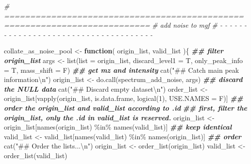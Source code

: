 \documentclass[
]{article}
\newenvironment{Shaded}{\begin{snugshade}}{\end{snugshade}}
\newcommand{\AttributeTok}[1]{\textcolor[rgb]{0.77,0.63,0.00}{#1}}
\newcommand{\CommentTok}[1]{\textcolor[rgb]{0.56,0.35,0.01}{\textit{#1}}}
\newcommand{\ControlFlowTok}[1]{\textcolor[rgb]{0.13,0.29,0.53}{\textbf{#1}}}
\newcommand{\DecValTok}[1]{\textcolor[rgb]{0.00,0.00,0.81}{#1}}
\newcommand{\DocumentationTok}[1]{\textcolor[rgb]{0.56,0.35,0.01}{\textbf{\textit{#1}}}}
\newcommand{\FunctionTok}[1]{\textcolor[rgb]{0.00,0.00,0.00}{#1}}
\newcommand{\NormalTok}[1]{#1}
\newcommand{\OtherTok}[1]{\textcolor[rgb]{0.56,0.35,0.01}{#1}}
\newcommand{\SpecialCharTok}[1]{\textcolor[rgb]{0.00,0.00,0.00}{#1}}
\newcommand{\StringTok}[1]{\textcolor[rgb]{0.31,0.60,0.02}{#1}}
\begin{document}
\begin{Shaded}
\begin{Highlighting}[]
\CommentTok{\# ==========================================================================}
\CommentTok{\# add noise to mgf}
\CommentTok{\# {-} {-} {-} {-} {-} {-} {-} {-} {-} {-} {-} {-} {-} {-} {-} {-} {-} {-} {-} {-} {-} {-} {-} {-} {-} {-} {-} {-} {-} {-} {-} {-} {-} {-} {-} {-} {-}}

\NormalTok{collate\_as\_noise\_pool }\OtherTok{\textless{}{-}} 
  \ControlFlowTok{function}\NormalTok{(}
\NormalTok{    origin\_list,}
\NormalTok{    valid\_list}
\NormalTok{    )\{}
    \DocumentationTok{\#\# filter origin\_list}
\NormalTok{    args }\OtherTok{\textless{}{-}} \FunctionTok{list}\NormalTok{(}\AttributeTok{list =}\NormalTok{ origin\_list, }\AttributeTok{discard\_level1 =}\NormalTok{ T, }\AttributeTok{only\_peak\_info =}\NormalTok{ T, }\AttributeTok{mass\_shift =}\NormalTok{ F)}
    \DocumentationTok{\#\# get mz and intensity}
    \FunctionTok{cat}\NormalTok{(}\StringTok{"\#\# Catch main peak information}\SpecialCharTok{\textbackslash{}n}\StringTok{"}\NormalTok{)}
\NormalTok{    origin\_list }\OtherTok{\textless{}{-}} \FunctionTok{do.call}\NormalTok{(spectrum\_add\_noise, args)}
    \DocumentationTok{\#\# discard the NULL data}
    \FunctionTok{cat}\NormalTok{(}\StringTok{"\#\# Discard empty dataset}\SpecialCharTok{\textbackslash{}n}\StringTok{"}\NormalTok{)}
\NormalTok{    order\_list }\OtherTok{\textless{}{-}}\NormalTok{ origin\_list[}\FunctionTok{vapply}\NormalTok{(origin\_list, is.data.frame, }\FunctionTok{logical}\NormalTok{(}\DecValTok{1}\NormalTok{), }\AttributeTok{USE.NAMES =}\NormalTok{ F)]}
    \DocumentationTok{\#\# order the origin\_list and valid\_list according to .id}
    \DocumentationTok{\#\# first, filter the origin\_list, only the .id in valid\_list is reserved.}
\NormalTok{    origin\_list }\OtherTok{\textless{}{-}}\NormalTok{ origin\_list[}\FunctionTok{names}\NormalTok{(origin\_list) }\SpecialCharTok{\%in\%} \FunctionTok{names}\NormalTok{(valid\_list)]}
    \DocumentationTok{\#\# keep identical}
\NormalTok{    valid\_list }\OtherTok{\textless{}{-}}\NormalTok{ valid\_list[}\FunctionTok{names}\NormalTok{(valid\_list) }\SpecialCharTok{\%in\%} \FunctionTok{names}\NormalTok{(origin\_list)]}
    \DocumentationTok{\#\# order}
    \FunctionTok{cat}\NormalTok{(}\StringTok{"\#\# Order the lists...}\SpecialCharTok{\textbackslash{}n}\StringTok{"}\NormalTok{)}
\NormalTok{    origin\_list }\OtherTok{\textless{}{-}} \FunctionTok{order\_list}\NormalTok{(origin\_list)}
\NormalTok{    valid\_list }\OtherTok{\textless{}{-}} \FunctionTok{order\_list}\NormalTok{(valid\_list)}

\end{Highlighting}
\end{Shaded}
\end{document}
